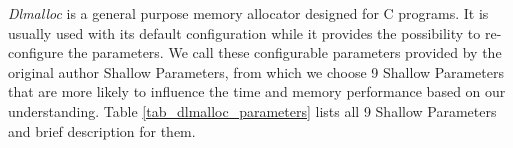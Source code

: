 \emph{Dlmalloc} is a general purpose memory allocator designed for C programs. It is usually used with its default configuration while it provides the possibility to re-configure the parameters. We call these configurable parameters provided by the original author Shallow Parameters, from which we choose 9 Shallow Parameters that are more likely to influence the time and memory performance based on our understanding. Table \ref{tab_dlmalloc_parameters} lists all 9 Shallow Parameters and brief description for them.



